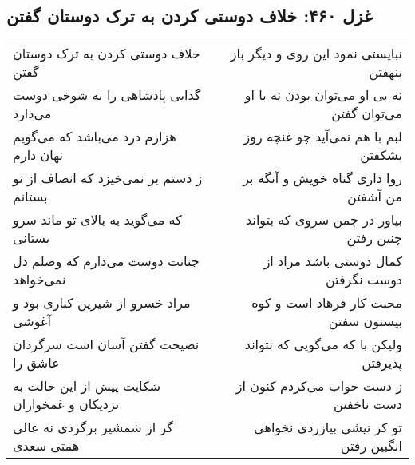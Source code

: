 \begin{center}
\section*{غزل ۴۶۰: خلاف دوستی کردن به ترک دوستان گفتن}
\label{sec:460}
\begin{longtable}{l p{0.5cm} r}
خلاف دوستی کردن به ترک دوستان گفتن
&&
نبایستی نمود این روی و دیگر باز بنهفتن
\\
گدایی پادشاهی را به شوخی دوست می‌دارد
&&
نه بی او می‌توان بودن نه با او می‌توان گفتن
\\
هزارم درد می‌باشد که می‌گویم نهان دارم
&&
لبم با هم نمی‌آید چو غنچه روز بشکفتن
\\
ز دستم بر نمی‌خیزد که انصاف از تو بستانم
&&
روا داری گناه خویش و آنگه بر من آشفتن
\\
که می‌گوید به بالای تو ماند سرو بستانی
&&
بیاور در چمن سروی که بتواند چنین رفتن
\\
چنانت دوست می‌دارم که وصلم دل نمی‌خواهد
&&
کمال دوستی باشد مراد از دوست نگرفتن
\\
مراد خسرو از شیرین کناری بود و آغوشی
&&
محبت کار فرهاد است و کوه بیستون سفتن
\\
نصیحت گفتن آسان است سرگردان عاشق را
&&
ولیکن با که می‌گویی که نتواند پذیرفتن
\\
شکایت پیش از این حالت به نزدیکان و غمخواران
&&
ز دست خواب می‌کردم کنون از دست ناخفتن
\\
گر از شمشیر برگردی نه عالی همتی سعدی
&&
تو کز نیشی بیازردی نخواهی انگبین رفتن
\\
\end{longtable}
\end{center}
